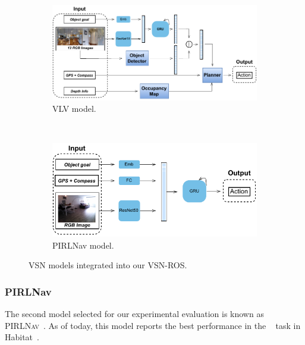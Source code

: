 \begin{figure}
    \centering
    \begin{subfigure}[b]{\textwidth}
        \includegraphics[width=\textwidth]{figures/ros4vsn/vlv_diagram}
        \caption{VLV model.}
        \label{fig:vlv_overview}
    \end{subfigure}
    ~
    \begin{subfigure}[b]{\textwidth}
        \includegraphics[width=\textwidth]{figures/ros4vsn/pirlnav_diagram}
        \caption{PIRLNav model.}
        \label{fig:pirlnav_overview}
    \end{subfigure}
    \caption{VSN models integrated into our VSN-ROS.}\label{fig:vsn_models_overview}
\end{figure}

\subsubsection{PIRLNav}
The second model selected for our experimental evaluation is known as \textsc{PIRLNav}~\cite{ramrakhya2023}.
As of today, this model reports the best performance in the \objnav~\cite{batra2020} task in Habitat~\cite{NEURIPS2021_021bbc7e}.

